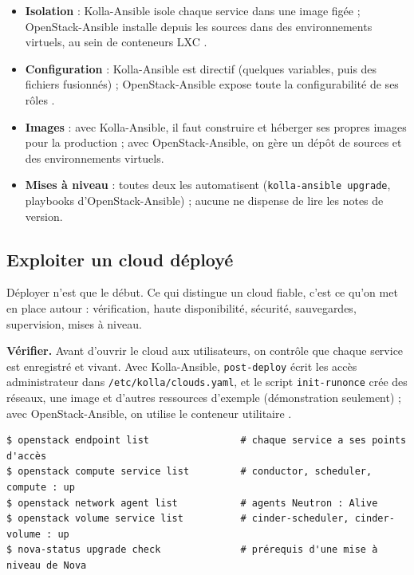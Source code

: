 \begin{itemize}
  \item \textbf{Isolation} : Kolla-Ansible isole chaque service dans une image figée ; OpenStack-Ansible installe depuis les sources
        dans des environnements virtuels, au sein de conteneurs LXC \parencite{osa-about}.
  \item \textbf{Configuration} : Kolla-Ansible est directif (quelques variables, puis des fichiers fusionnés) ; OpenStack-Ansible
        expose toute la configurabilité de ses rôles \parencite{kolla-ansible-philosophy,osa-about}.
  \item \textbf{Images} : avec Kolla-Ansible, il faut construire et héberger ses propres images pour la production ; avec
        OpenStack-Ansible, on gère un dépôt de sources et des environnements virtuels.
  \item \textbf{Mises à niveau} : toutes deux les automatisent (\texttt{kolla-ansible upgrade}, playbooks d'OpenStack-Ansible) ;
        aucune ne dispense de lire les notes de version.
\end{itemize}

\subsection{Exploiter un cloud déployé}\label{sec:dep-exploitation}

Déployer n'est que le début. Ce qui distingue un cloud fiable, c'est ce qu'on met en place autour : vérification, haute
disponibilité, sécurité, sauvegardes, supervision, mises à niveau.

\textbf{Vérifier.} Avant d'ouvrir le cloud aux utilisateurs, on contrôle que chaque service est enregistré et vivant. Avec
Kolla-Ansible, \texttt{post-deploy} écrit les accès administrateur dans \texttt{/etc/kolla/clouds.yaml}, et le script \texttt{init-runonce}
crée des réseaux, une image et d'autres ressources d'exemple (démonstration seulement) \parencite{kolla-ansible-quickstart} ; avec OpenStack-Ansible,
on utilise le conteneur utilitaire \parencite{osa-verify}.

\par\noindent\begin{minipage}{\linewidth}
\begin{lstlisting}[style=terminal]
$ openstack endpoint list                # chaque service a ses points d'accès
$ openstack compute service list         # conductor, scheduler, compute : up
$ openstack network agent list           # agents Neutron : Alive
$ openstack volume service list          # cinder-scheduler, cinder-volume : up
$ nova-status upgrade check              # prérequis d'une mise à niveau de Nova
\end{lstlisting}
\end{minipage}\par

